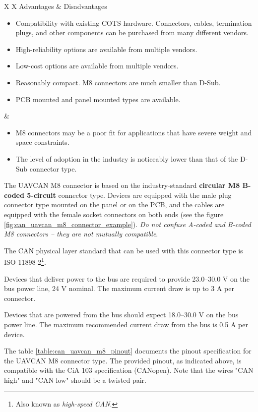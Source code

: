 {
\NoLeftSkip
\begin{UAVCANCompactTable}{X X}
    Advantages & Disadvantages \\
    \begin{itemize}
        \item Compatibility with existing COTS hardware.
        Connectors, cables, termination plugs, and other components can be purchased from many different vendors.
        \item High-reliability options are available from multiple vendors.
        \item Low-cost options are available from multiple vendors.
        \item Reasonably compact. M8 connectors are much smaller than D-Sub.
        \item PCB mounted and panel mounted types are available.
    \end{itemize}
    &
    \begin{itemize}
        \item M8 connectors may be a poor fit for applications that have severe weight and space constraints.
        \item The level of adoption in the industry is noticeably lower than that of the D-Sub connector type.
    \end{itemize}
\end{UAVCANCompactTable}
}

The UAVCAN M8 connector is based on the industry-standard \textbf{circular M8 B-coded 5-circuit} connector type.
Devices are equipped with the male plug connector type
mounted on the panel or on the PCB, and the cables are equipped with the female socket connectors on both ends
(see the figure \ref{fig:can_uavcan_m8_connector_example}).
\emph{Do not confuse A-coded and B-coded M8 connectors -- they are not mutually compatible}.

The CAN physical layer standard that can be used with this connector type is
ISO 11898-2\footnote{Also known as \emph{high-speed CAN}.}.

Devices that deliver power to the bus are required to provide 23.0--30.0 V on the bus power line, 24 V nominal.
The maximum current draw is up to 3 A per connector.

Devices that are powered from the bus should expect 18.0--30.0 V on the bus power line.
The maximum recommended current draw from the bus is 0.5 A per device.

The table \ref{table:can_uavcan_m8_pinout} documents the pinout specification for the UAVCAN M8 connector type.
The provided pinout, as indicated above, is compatible with the CiA 103 specification (CANopen).
Note that the wires "CAN high" and "CAN low" should be a twisted pair.

